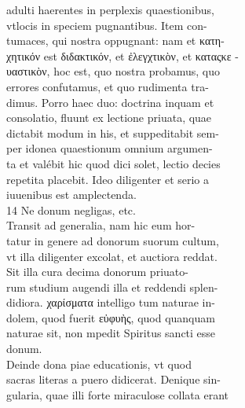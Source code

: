 \documentclass{article}
\begin{document}
\begin{pages}
{                }adulti haerentes in perplexis quaestionibus, \\
                vtlocis in speciem pugnantibus. Item con- \\
                tumaces, qui nostra oppugnant: nam et κατη- \\
                χητικόν est διδακτικόν, et ἐλεγχτικὸν, et καταςκε - \\
                υαστικὸν, hoc est, quo nostra probamus, quo \\
                errores confutamus, et quo rudimenta tra- \\
                dimus. Porro haec duo: doctrina inquam et \\
                consolatio, fluunt ex lectione priuata, quae \\
                dictabit modum in his, et suppeditabit sem- \\
                per idonea quaestionum omnium argumen- \\
                ta et valébit hic quod dici solet, lectio decies \\
                repetita placebit. Ideo diligenter et serio a \\
                iuuenibus est amplectenda. \\
                14  Ne donum negligas, etc. \\
                Transit ad generalia, nam hic eum hor- \\
                tatur in genere ad donorum suorum cultum, \\
                vt illa diligenter excolat, et auctiora reddat. \\
                Sit illa cura decima donorum priuato- \\
                rum studium augendi illa et reddendi splen- \\
                didiora. χαρίσματα intelligo tum naturae in- \\
                dolem, quod fuerit εὐφυὴς, quod quanquam \\
                naturae sit, non mpedit Spiritus sancti esse \\
                donum. \\
                Deinde dona piae educationis, vt quod \\
                sacras literas a puero didicerat. Denique sin- \\
                gularia, quae illi forte miraculose collata erant \\

\end{pages}
\end{document}
